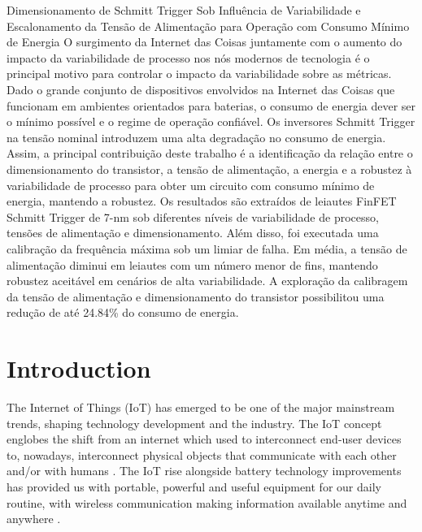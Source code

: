 \documentclass[pgmicro,mestrado,english]{iiufrgs}
\begin{document}
\begin{englishabstract}
{
Dimensionamento de Schmitt Trigger Sob Influência de Variabilidade e Escalonamento da Tensão de Alimentação para Operação com Consumo Mínimo de Energia
}
{
O surgimento da Internet das Coisas juntamente com o aumento do impacto da variabilidade de processo nos nós modernos de tecnologia é o principal motivo para controlar o impacto da variabilidade sobre as métricas. Dado o grande conjunto de dispositivos envolvidos na Internet das Coisas que funcionam em ambientes orientados para baterias, o consumo de energia dever ser o mínimo possível e o regime de operação confiável. Os inversores Schmitt Trigger na tensão nominal introduzem uma alta degradação no consumo de energia. Assim, a principal contribuição deste trabalho é a identificação da relação entre o dimensionamento do transistor, a tensão de alimentação, a energia e a robustez à variabilidade de processo para obter um circuito com consumo mínimo de energia, mantendo a robustez. Os resultados são extraídos de leiautes FinFET Schmitt Trigger de 7-nm sob diferentes níveis de variabilidade de processo, tensões de alimentação e dimensionamento. Além disso, foi executada uma calibração da frequência máxima sob um limiar de falha. Em média, a tensão de alimentação diminui em leiautes com um número menor de fins, mantendo robustez aceitável em cenários de alta variabilidade. A exploração da calibragem da tensão de alimentação e dimensionamento do transistor possibilitou uma redução de até 24.84\% do consumo de energia.
}
\end{englishabstract}

\chapter{Introduction}
    The Internet of Things (IoT) has emerged to be one of the major mainstream trends, shaping technology development and the industry. The IoT concept englobes the shift from an internet which used to interconnect end-user devices to, nowadays, interconnect physical objects that communicate with each other and/or with humans \cite{miorandi2012internet}. The IoT rise alongside battery technology improvements has provided us with portable, powerful and useful equipment for our daily routine, with wireless communication making information available anytime and anywhere \cite{manoli2010energy}.
\end{document}
